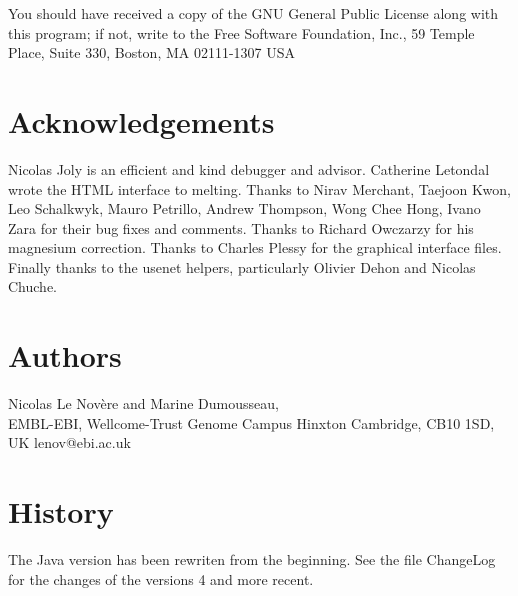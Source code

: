 \documentclass{article}
\begin{document}
  You should have received a copy of the GNU General Public License 
along with this program; if not, write to the Free Software Foundation, 
Inc., 59 Temple Place, Suite 330, Boston, MA  02111-1307 USA   
   
\section{Acknowledgements}
Nicolas Joly is an efficient and kind debugger and advisor.  Catherine
Letondal wrote the HTML interface to melting. Thanks to Nirav Merchant,
Taejoon Kwon, Leo Schalkwyk, Mauro Petrillo, Andrew Thompson, Wong Chee Hong, Ivano
Zara for their bug fixes and comments. Thanks to Richard Owczarzy for his magnesium 
correction. Thanks to Charles Plessy for the graphical interface files. Finally thanks
to the usenet helpers, particularly Olivier Dehon and Nicolas Chuche.

   
\section{Authors }
Nicolas Le Nov\`ere and Marine Dumousseau, \\
EMBL-EBI, 
Wellcome-Trust Genome Campus
Hinxton Cambridge, CB10 1SD, UK
lenov@ebi.ac.uk
  
\section{History }

The Java version has been rewriten from the beginning.
See the file ChangeLog for the changes of the versions 4 and more recent.
\end{document}
